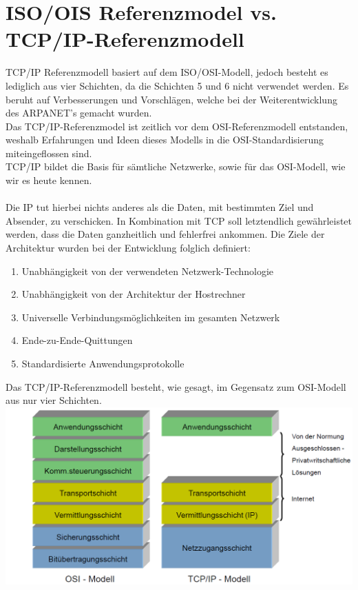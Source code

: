 \documentclass[11pt]{article}
\begin{document}
    \section{ISO/OIS Referenzmodel vs. TCP/IP-Referenzmodell}
    TCP/IP Referenzmodell basiert auf dem ISO/OSI-Modell, jedoch besteht es lediglich aus vier Schichten,
    da die Schichten 5 und 6 nicht verwendet werden. Es beruht auf Verbesserungen und Vorschlägen, welche bei der
    Weiterentwicklung des ARPANET's gemacht wurden.\\
    Das TCP/IP-Referenzmodel ist zeitlich vor dem OSI-Referenzmodell entstanden, weshalb Erfahrungen und Ideen dieses
    Modells in die OSI-Standardisierung miteingeflossen sind.\\
    TCP/IP bildet die Basis für sämtliche Netzwerke, sowie für das OSI-Modell, wie wir es heute
    kennen. \\\\
    Die IP tut hierbei nichts anderes als die Daten, mit bestimmten Ziel und Absender, zu verschicken.
    In Kombination mit TCP soll letztendlich gewährleistet werden, dass die Daten ganzheitlich und fehlerfrei ankommen.
    Die Ziele der Architektur wurden bei der Entwicklung folglich definiert:
    \begin{enumerate}
        \item{Unabhängigkeit von der verwendeten Netzwerk-Technologie}
        \item{Unabhängigkeit von der Architektur der Hostrechner}
        \item{Universelle Verbindungsmöglichkeiten im gesamten Netzwerk}
        \item{Ende-zu-Ende-Quittungen}
        \item{Standardisierte Anwendungsprotokolle}
    \end{enumerate}

    Das TCP/IP-Referenzmodell besteht, wie gesagt, im Gegensatz zum OSI-Modell aus nur vier Schichten.\\

    \includegraphics[width = \textwidth]{tcp_ip_model.png}
\end{document}
